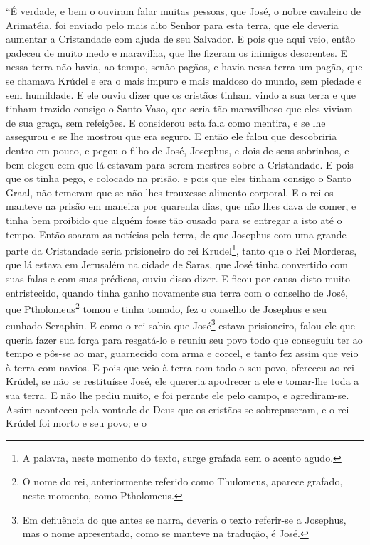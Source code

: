 “É verdade, e bem o ouviram falar muitas pessoas, que José, o nobre
cavaleiro de Arimatéia, foi enviado pelo mais alto Senhor para esta terra, que
ele deveria aumentar a Cristandade com ajuda de seu Salvador. E pois que aqui
veio, então padeceu de muito medo e maravilha, que lhe fizeram os inimigos
descrentes. E nessa terra não havia, ao tempo, senão pagãos, e havia nessa
terra um pagão, que se chamava Krúdel e era o mais impuro e mais maldoso do
mundo, sem piedade e sem humildade. E ele ouviu dizer que os cristãos
tinham vindo a sua terra e que tinham trazido consigo o Santo Vaso, que seria
tão maravilhoso que eles viviam de sua graça, sem refeições. E considerou esta
fala como mentira, e se lhe assegurou e se lhe mostrou que era seguro. E então
ele falou que descobriria dentro em pouco, e pegou o filho de José, Josephus, e
dois de seus sobrinhos, e bem elegeu cem que lá estavam para serem mestres
sobre a Cristandade. E pois que os tinha pego, e colocado na prisão, e pois que
eles tinham consigo o Santo Graal, não temeram que se não lhes trouxesse
alimento corporal. E o rei os manteve na prisão em maneira por quarenta dias,
que não lhes dava de comer, e tinha bem proibido que alguém fosse tão ousado
para se entregar a isto até o tempo. Então soaram as notícias pela terra, de
que Josephus com uma grande parte da Cristandade seria prisioneiro do rei
Krudel\footnote{ A palavra, neste momento do texto, surge grafada sem o acento
agudo.},  tanto que o Rei Morderas,  que lá estava em Jerusalém na
cidade de Saras, que José tinha convertido com suas falas e com suas prédicas,
ouviu disso dizer. E ficou por causa disto muito entristecido, quando tinha
ganho novamente sua terra com o conselho de José, que Ptholomeus\footnote{ O
nome do rei, anteriormente referido como Thulomeus, aparece grafado, neste
momento, como Ptholomeus.}  tomou e tinha tomado, fez o conselho de
Josephus e seu cunhado Seraphin. E como o rei sabia que José\footnote{ Em
defluência do que antes se narra, deveria o texto referir-se a Josephus, mas o
nome apresentado, como se manteve na tradução, é José.}  estava
prisioneiro, falou ele que queria fazer sua força para resgatá-lo e reuniu seu
povo todo que conseguiu ter ao tempo e pôs-se ao mar, guarnecido com arma e
corcel, e tanto fez assim que veio à terra com navios. E pois que veio à terra
com todo o seu povo, ofereceu ao rei Krúdel, se não se restituísse José, ele
quereria apodrecer a ele e tomar-lhe toda a sua terra. E não lhe pediu muito, e
foi perante ele pelo campo, e agrediram-se. Assim aconteceu pela vontade de
Deus que os cristãos se sobrepuseram, e o rei Krúdel foi morto e seu povo; e o
